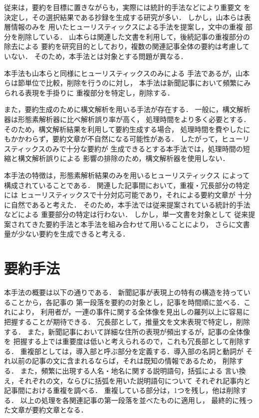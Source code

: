 従来は，要約を目標に置きながらも，実際には統計的手法などにより重要文
を決定し，その選択結果である抄録を生成する研究が多い．
しかし，山本らは表層情報のみを
用いたヒューリスティックスによる手法を提案し，文中の重複
部分を削除している．
山本らは関連した文書を利用して，後続記事の重複部分の除去による
要約を研究目的としており，複数の関連記事全体の要約は考慮していない．
そのため，本手法とは対象とする問題が異なる．

本手法も山本らと同様にヒューリスティックスのみによる
手法であるが，山本らは節単位で比較，削除を行うのに対し，
本手法は新聞記事において頻繁にみられる表現を手掛りに
重複部分を特定し，削除する．

また，要約生成のために構文解析を用いる手法\cite{Mikami98,Mikami99}が存在する．
一般に，構文解析器は形態素解析器に比べ解析誤り率が高く，
処理時間をより多く必要とする．
そのため，構文解析結果を利用して要約生成する場合，
処理時間を費やしたにもかかわらず，要約文章が不自然になる可能性がある．
したがって，ヒューリスティックスのみで十分な要約が
生成できるとする本手法では，処理時間の短縮と構文解析誤りによる
影響の排除のため，構文解析器を使用しない．

本手法の特徴は，形態素解析結果のみを用いるヒューリスティックス
によって構成されていることである．
関連した記事間において，重複・冗長部分の特定には
ヒューリスティックスで十分対応可能であり，それによる要約文章が
十分に自然であると考えた．
そのため，本手法では従来提案されている統計的手法などによる
重要部分の特定は行わない．
しかし，単一文書を対象として
従来提案されてきた要約手法と本手法を組み合わせて用いることにより，
さらに文書量が少ない要約を生成できると考える．
\section{要約手法}
\label{要約手法}
本手法の概要は以下の通りである．
新聞記事が表現上の特有の構造を持っていることから，各記事の
第一段落を要約の対象とし，記事を時間順に並べる．これにより，
利用者が，一連の事件に関する全体像を見出しの羅列以上に容易に
把握することが期待できる．
冗長部として，推量文を文末表現で特定し，削除する．
また，新聞記事において詳細な住所の表現が頻出するが，記事の全体像を
把握する上では重要度は低いと考えられるので，これも冗長部として削除する．
重複部としては，導入部と呼ぶ部分を定義する．導入部の名詞と動詞が
それ以前の記事の文に含まれるならば，それは既知の情報であるため，
削除する．
また，頻繁に出現する人名・地名に関する説明語句，括弧による
言い換え，それぞれの文，ならびに括弧を用いた説明語句について
それぞれ記事内と記事間における重複を調べる．
重複している部分は，1つを残し，他は削除する．
以上の処理を各関連記事の第一段落を並べたものに適用し，
最終的に残った文章が要約文章となる．

